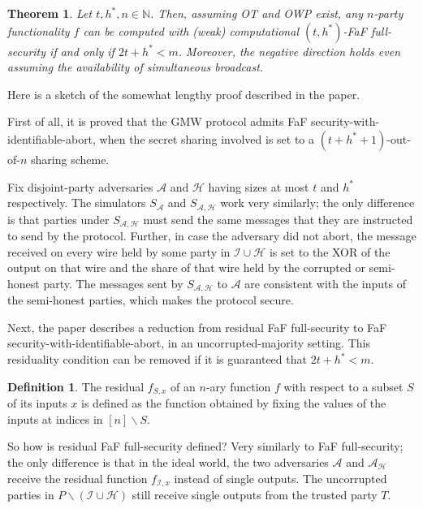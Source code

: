 \documentclass[11pt, a4paper]{article}
\newtheorem{theorem}{Theorem}[section]
\theoremstyle{definition}
\newtheorem{definition}{Definition}[section]
\theoremstyle{remark}
\begin{document}
\begin{theorem}
Let $t,h^*,n\in\mathbb{N}$. Then, assuming OT and OWP exist, any $n$-party functionality $f$ can be computed with (weak) computational $(t, h^*)$-FaF full-security if and only if $2t+h^* < m$. Moreover, the negative direction holds even assuming the availability of simultaneous broadcast.
\end{theorem}
Here is a sketch of the somewhat lengthy proof described in the paper.

\medskip

First of all, it is proved that the GMW protocol admits FaF security-with-identifiable-abort, when the secret sharing involved is set to a $(t+h^*+1)$-out-of-$n$ sharing scheme.

\medskip

Fix disjoint-party adversaries $\mathcal{A}$ and $\mathcal{H}$ having sizes at most $t$ and $h^*$ respectively. The simulators $S_{\mathcal{A}}$ and $S_{\mathcal{A},\mathcal{H}}$ work very similarly; the only difference is that parties under $S_{\mathcal{A},\mathcal{H}}$ must send the same messages that they are instructed to send by the protocol. Further, in case the adversary did not abort, the message received on every wire held by some party in $\mathcal{I}\cup\mathcal{H}$ is set to the XOR of the output on that wire and the share of that wire held by the corrupted or semi-honest party. The messages sent by $S_{\mathcal{A},\mathcal{H}}$ to $\mathcal{A}$ are consistent with the inputs of the semi-honest parties, which makes the protocol secure.

\medskip

Next, the paper describes a reduction from residual FaF full-security to FaF security-with-identifiable-abort, in an uncorrupted-majority setting. This residuality condition can be removed if it is guaranteed that $2t+h^*<m$.

\medskip

\begin{definition}
The residual $f_{S,x}$ of an $n$-ary function $f$ with respect to a subset $S$ of its inputs $x$ is defined as the function obtained by fixing the values of the inputs at indices in $[n]\backslash S$.
\end{definition}

\medskip

So how is residual FaF full-security defined? Very similarly to FaF full-security; the only difference is that in the ideal world, the two adversaries $\mathcal{A}$ and $\mathcal{A}_{\mathcal{H}}$ receive the residual function $f_{\mathcal{I},x}$ instead of single outputs. The uncorrupted parties in $P\backslash(\mathcal{I}\cup\mathcal{H})$ still receive single outputs from the trusted party $T$.
\end{document}
